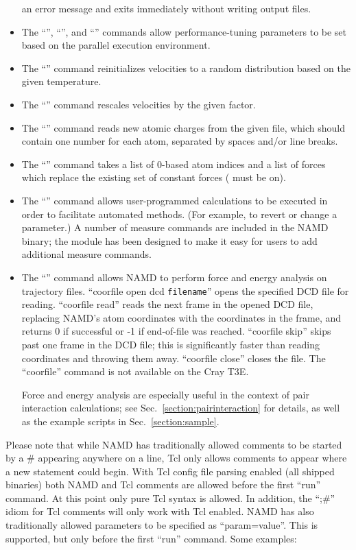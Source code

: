 \begin{itemize}
    an error message and exits immediately without writing output files.
 \item The ``'', ``'', and
    ``'' commands allow performance-tuning
    parameters to be set based on the parallel execution environment.
 \item The ``'' command reinitializes velocities to a
    random distribution based on the given temperature.
 \item The ``'' command rescales velocities by
    the given factor.
 \item The ``'' command reads new atomic charges from
    the given file, which should contain one number for each atom, separated
    by spaces and/or line breaks.
 \item The ``'' command takes a list of
    0-based atom indices and a list of forces which replace the existing
    set of constant forces ( must be on).
 \item The ``'' command allows user-programmed calculations to
    be executed in order to facilitate automated methods.  (For
    example, to revert or change a parameter.)  A number of measure
    commands are included in the NAMD binary; the module has been designed
    to make it easy for users to add additional measure commands.  
 \item The ``'' command allows NAMD to perform force and energy
    analysis on trajectory files.  ``coorfile open dcd {\tt filename}'' opens
    the specified DCD file for reading.  ``coorfile read'' reads the next
    frame in the opened DCD file, replacing NAMD's atom coordinates with the
    coordinates in the frame, and returns 0 if successful or -1 if  
    end-of-file was reached.  ``coorfile skip'' skips past one frame in the
    DCD file; this is significantly faster than reading coordinates and 
    throwing them away.  ``coorfile close'' closes the file.   
    The ``coorfile'' command is not available on the Cray T3E.

    Force and energy analysis are especially useful in the context of 
    pair interaction calculations; see Sec.~\ref{section:pairinteraction}
    for details, as well as the example scripts in Sec.~\ref{section:sample}.
\end{itemize}


Please note that while NAMD has traditionally allowed comments to be
started by a \# appearing anywhere on a line, Tcl only allows comments
to appear where a new statement could begin.  With Tcl config file
parsing enabled (all shipped binaries) both NAMD and Tcl comments are
allowed before the first ``run'' command.  At this point only pure Tcl
syntax is allowed.  In addition, the ``;\#'' idiom for Tcl comments will
only work with Tcl enabled.  NAMD has also traditionally allowed
parameters to be specified as ``param=value''.  This is supported, but
only before the first ``run'' command.  Some examples:

